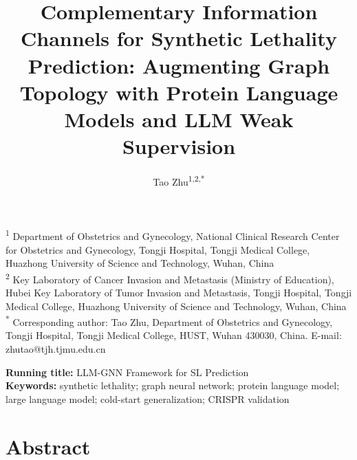 \documentclass[12pt,a4paper]{article}
\title{\textbf{Complementary Information Channels for Synthetic Lethality Prediction: Augmenting Graph Topology with Protein Language Models and LLM Weak Supervision}}
\author{
    Tao Zhu\textsuperscript{1,2,*}
}
\date{}
\begin{document}
\maketitle

\vspace{-8mm}

\begin{flushleft}
\textsuperscript{1} Department of Obstetrics and Gynecology, National Clinical Research Center for Obstetrics and Gynecology, Tongji Hospital, Tongji Medical College, Huazhong University of Science and Technology, Wuhan, China\\
\textsuperscript{2} Key Laboratory of Cancer Invasion and Metastasis (Ministry of Education), Hubei Key Laboratory of Tumor Invasion and Metastasis, Tongji Hospital, Tongji Medical College, Huazhong University of Science and Technology, Wuhan, China\\[3pt]
\textsuperscript{*} Corresponding author: Tao Zhu, Department of Obstetrics and Gynecology, Tongji Hospital, Tongji Medical College, HUST, Wuhan 430030, China. E-mail: zhutao@tjh.tjmu.edu.cn
\end{flushleft}

\vspace{2mm}
\begin{flushleft}
\textbf{Running title:} LLM-GNN Framework for SL Prediction\\[2pt]
\textbf{Keywords:} synthetic lethality; graph neural network; protein language model; large language model; cold-start generalization; CRISPR validation
\end{flushleft}

\linenumbers

\section*{Abstract}
\end{document}
